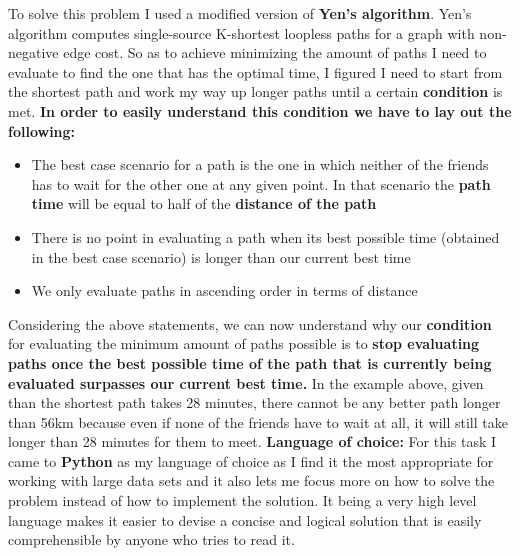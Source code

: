 \documentclass[12pt]{article}
\begin{document}
\newpage

To solve this problem I used a modified version of \textbf{Yen's algorithm}.
Yen's algorithm computes single-source K-shortest loopless paths for a graph with non-negative edge cost.
\newline
\newline
So as to achieve minimizing the amount of paths I need to evaluate to find the one that has the optimal time, I figured I need to start from the shortest path and work my way up longer paths until a certain \textbf{condition} is met.
\newline
\newline
\textbf{In order to easily understand this condition we have to lay out the following:}
\begin{itemize}
    \item The best case scenario for a path is the one in which neither of the friends has to wait for the other one at any given point. In that scenario the \textbf{path time} will be equal to half of the \textbf{distance of the path}
    \item There is no point in evaluating a path when its best possible time (obtained in the best case scenario) is longer than our current best time
    \item We only evaluate paths in ascending order in terms of distance
\end{itemize}
Considering the above statements, we can now understand why our \textbf{condition} for evaluating the minimum amount of paths possible is to \textbf{stop evaluating paths once the best possible time of the path that is currently being evaluated surpasses our current best time.}
\newline
\newline
In the example above, given than the shortest path takes 28 minutes, there cannot be any better path longer than 56km because even if none of the friends have to wait at all, it will still take longer than 28 minutes for them to meet.
\newline
\newline
\textbf{Language of choice:}
\newline
For this task I came to \textbf{Python} as my language of choice as I find it the most appropriate for working with large data sets and it also lets me focus more on how to solve the problem instead of how to implement the solution. It being a very high level language makes it easier to devise a concise and logical solution that is easily comprehensible by anyone who tries to read it.
\newpage
\end{document}
